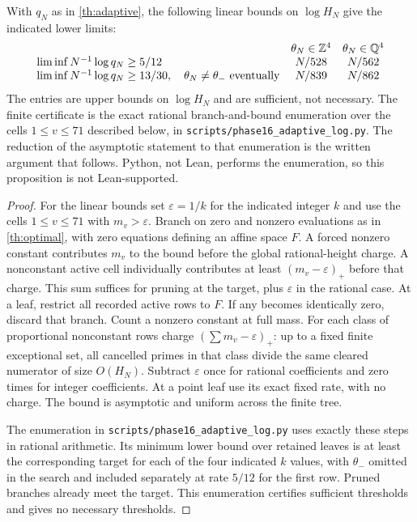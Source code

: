 \documentclass[11pt]{article}
\begin{document}
\begin{proposition}\label{prop:thresholds}
With $q_N$ as in \cref{th:adaptive}, the following linear bounds on $\log H_N$ give the indicated lower limits:
\[
\begin{array}{lcc}
 & \theta_N\in\mathbb Z^4 & \theta_N\in\mathbb Q^4\\
 \liminf N^{-1}\log q_N\ge5/12 & N/528 & N/562\\
 \liminf N^{-1}\log q_N\ge13/30,\quad \theta_N\ne\theta_-\text{ eventually}
             & N/839 & N/862
\end{array}
\]
The entries are upper bounds on $\log H_N$ and are sufficient, not necessary. The finite certificate is the exact rational branch-and-bound enumeration over the cells $1\le v\le71$ described below, in \texttt{scripts/phase16\_adaptive\_log.py}. The reduction of the asymptotic statement to that enumeration is the written argument that follows. Python, not Lean, performs the enumeration, so this proposition is not Lean-supported.
\end{proposition}
\begin{proof}
For the linear bounds set $\varepsilon=1/k$ for the indicated integer $k$ and use the cells $1\le v\le71$ with $m_v>\varepsilon$. Branch on zero and nonzero evaluations as in \cref{th:optimal}, with zero equations defining an affine space $F$. A forced nonzero constant contributes $m_v$ to the bound before the global rational-height charge. A nonconstant active cell individually contributes at least $(m_v-\varepsilon)_+$ before that charge. This sum suffices for pruning at the target, plus $\varepsilon$ in the rational case. At a leaf, restrict all recorded active rows to $F$. If any becomes identically zero, discard that branch. Count a nonzero constant at full mass. For each class of proportional nonconstant rows charge $(\sum m_v-\varepsilon)_+$: up to a fixed finite exceptional set, all cancelled primes in that class divide the same cleared numerator of size $O(H_N)$. Subtract $\varepsilon$ once for rational coefficients and zero times for integer coefficients. At a point leaf use its exact fixed rate, with no charge. The bound is asymptotic and uniform across the finite tree.

The enumeration in \texttt{scripts/phase16\_adaptive\_log.py} uses exactly these steps in rational arithmetic. Its minimum lower bound over retained leaves is at least the corresponding target for each of the four indicated $k$ values, with $\theta_-$ omitted in the search and included separately at rate $5/12$ for the first row. Pruned branches already meet the target. This enumeration certifies sufficient thresholds and gives no necessary thresholds.
\end{proof}
\end{document}
